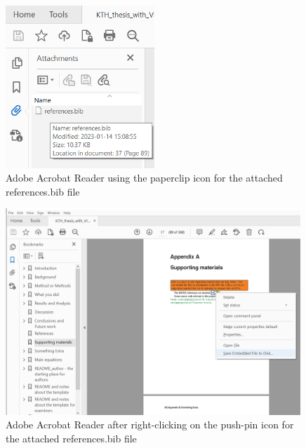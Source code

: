 \documentclass[nomenclature, english, biblatex]{kththesis}
\numberwithin{listing}{chapter}
\begin{document}
\begin{figure}[!ht]
  \begin{center}
    \includegraphics[width=0.50\textwidth]{README_notes/pdf-viewer-attached-files.png}
  \end{center}
  \caption{Adobe Acrobat Reader using the paperclip icon for the attached references.bib file}
  \label{fig:PDFreaderPaperclipExample}
\end{figure}
\FloatBarrier

\begin{figure}[!ht]
  \begin{center}
    \includegraphics[width=0.99\textwidth]{README_notes/Bib-save-embedded-example.png}
  \end{center}
  \caption{Adobe Acrobat Reader after right-clicking on the push-pin icon for the attached references.bib file}
  \label{fig:PDFreaderPushpinExample}
\end{figure}
\FloatBarrier
\cleardoublepage
\end{document}
